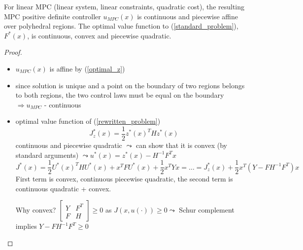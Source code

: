 \begin{Theorem}
For linear MPC (linear system, linear constraints, quadratic cost), the resulting MPC positive definite controller $u_{MPC}(x)$ is continuous and piecewise affine over polyhedral regions. The optimal value function to (\ref{standard_problem}), $F^*(x)$, is continuous, convex and piecewise quadratic.
\begin{proof}
\begin{itemize}
\item $u_{MPC}(x)$ is affine by (\ref{optimal_z})
\item since solution is unique and a point on the boundary of two regions belongs to both regions, the two control laws must be equal on the boundary $\Rightarrow u_{MPC}$ - continuous
\item optimal value function of (\ref{rewritten_problem})
\begin{equation*}
J_z^*(x) = \frac{1}{2}z^*(x)^THz^*(x) 
\end{equation*} 
continuous and piecewise quadratic
$\leadsto$ can show that it is convex (by standard arguments) $\leadsto u^*(x) = z^*(x) - H^{-1}F^Tx$
\begin{equation*}
J^*(x) = \frac{1}{2}U^*(x)^THU^*(x) + x^TFU^*(x) + \frac{1}{2}x^TYx = \dots = J_z^*(x) + \frac{1}{2}x^T(Y-FH^{-1}F^T)x
\end{equation*}
First term is convex, continuous piecewise quadratic, the second term is continuous quadratic + convex.

Why convex?
$\begin{bmatrix}
Y & F^T \\
F & H
\end{bmatrix} \geq 0$ as $J(x,u(\cdot)) \geq 0 \leadsto$ Schur complement implies $Y-FH^{-1}F^T \geq 0$ 
\end{itemize}
\end{proof}
\end{Theorem}
